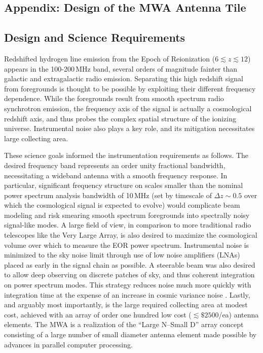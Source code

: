 \begin{subappendices}

\section{Appendix: Design of the MWA Antenna Tile}

\subsection{Design and Science Requirements}
Redshifted hydrogen line emission from the Epoch of Reionization ($6\lesssim z\lesssim12$) appears in the 100-200\,MHz band, several orders of magnitude fainter than galactic and extragalactic radio emission. Separating this high redshift signal from foregrounds is thought to be possible by exploiting their different frequency dependence. While the foregrounds result from smooth spectrum radio synchrotron emission, the frequency axis of the signal is actually a cosmological redshift axis, and thus probes the complex spatial structure of the ionizing universe. Instrumental noise also plays a key role, and its mitigation necessitates large collecting area.

These science goals informed the instrumentation requirements as follows. The desired frequency band represents an order unity fractional bandwidth, necessitating a wideband antenna with a smooth frequency response. In particular, significant frequency structure on scales smaller than the nominal power spectrum analysis bandwidth of 10\,MHz (set by timescale of $\Delta z\sim0.5$ over which the cosmological signal is expected to evolve) would complicate beam modeling and risk smearing smooth spectrum foregrounds into spectrally noisy signal-like modes. A large field of view, in comparison to more traditional radio telescopes like the Very Large Array, is also desired to maximize the cosmological volume over which to measure the EOR power spectrum. Instrumental noise is minimized to the sky noise limit through use of low noise amplifiers (LNAs) placed as early in the signal chain as possible. A steerable beam was also desired to allow deep observing on discrete patches of sky, and thus coherent integration on power spectrum modes. This strategy reduces noise much more quickly with integration time at the expense of an increase in cosmic variance noise \citep{TrottObservingModes}. Lastly, and arguably most importantly, is the large required collecting area at modest cost, achieved with an array of order one hundred low cost ($\lesssim\$2500$/ea) antenna elements. The MWA is a realization of the ``Large N--Small D'' array concept consisting of a large number of small diameter antenna element made possible by advances in parallel computer processing. 


\end{subappendices}
